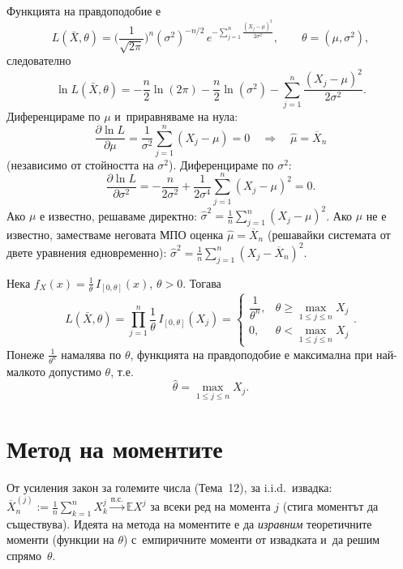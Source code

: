 \begin{proofbox}
Функцията на правдоподобие е
\[
  L(\bar X,\theta) = \Big(\frac1{\sqrt{2\pi}}\Big)^{n}(\sigma^2)^{-n/2}\,e^{-\sum_{j=1}^n\frac{(X_j-\mu)^2}{2\sigma^2}}, \qquad \theta=(\mu,\sigma^2),
\]
следователно
\[
  \ln L(\bar X,\theta) = -\frac n2\ln(2\pi) - \frac n2\ln(\sigma^2) - \sum_{j=1}^{n}\frac{(X_j-\mu)^2}{2\sigma^2}.
\]
Диференцираме по $\mu$ и~приравняваме на нула:
\[
  \frac{\partial\ln L}{\partial\mu} = \frac1{\sigma^2}\sum_{j=1}^n (X_j-\mu) = 0 \quad\Longrightarrow\quad \hat\mu = \overline X_n
\]
(независимо от стойността на $\sigma^2$). Диференцираме по $\sigma^2$:
\[
  \frac{\partial\ln L}{\partial\sigma^2} = -\frac{n}{2\sigma^2} + \frac1{2\sigma^4}\sum_{j=1}^n(X_j-\mu)^2 = 0.
\]
Ако $\mu$ е известно, решаваме директно: $\hat\sigma^2 = \tfrac1n
\sum_{j=1}^n(X_j-\mu)^2$. Ако $\mu$ не е известно, заместваме
неговата МПО оценка $\hat\mu=\overline X_n$ (решавайки системата от
двете уравнения едновременно): $\hat\sigma^2=\tfrac1n\sum_{j=1}^n
(X_j-\overline X_n)^2$. \qedbg
\end{proofbox}

\begin{rembox}
Нека $f_X(x)=\tfrac1\theta\,I_{[0,\theta]}(x)$, $\theta>0$.
Тогава
\[
  L(\bar X,\theta) = \prod_{j=1}^{n}\frac1\theta\,I_{[0,\theta]}(X_j) = \begin{cases}\dfrac1{\theta^n}, & \theta\ge\max_{1\le j\le n}X_j\\ 0, & \theta<\max_{1\le j\le n}X_j\end{cases}.
\]
Понеже $\tfrac1{\theta^n}$ намалява по $\theta$, функцията на
правдоподобие е максимална при най-малкото допустимо $\theta$, т.е.
\[
  \hat\theta = \max_{1\le j\le n} X_j.
\]
\end{rembox}

\section{Метод на моментите}

\begin{rembox}[Идея]
От усиления закон за големите числа (Тема~12), за i.i.d.\ извадка:
$\overline X_n^{(j)} := \tfrac1n\sum_{k=1}^n X_k^j
\xrightarrow{\text{п.с.}}\mathbb EX^j$ за всеки ред на момента $j$
(стига моментът да съществува). Идеята на метода на моментите е да
\emph{изравним} теоретичните моменти (функции на $\theta$) с~емпиричните моменти от извадката и~да решим спрямо~$\theta$.
\end{rembox}

